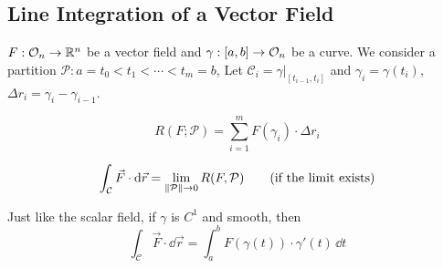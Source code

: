 \documentclass[../Analysis-3.tex]{subfiles}
\begin{document}
\subsection{Line Integration of a Vector Field}

$F:\mathcal{O}_{n} \to \mathbb{R}^n$ be a vector field and $\gamma:[a,b] \to \mathcal{O}_{n}$ be a curve. We consider a partition $\mathcal{P}: a =t_0<t_1<\cdots < t_m=b$, Let $\mathcal{C}_i = \gamma|_{[t_{i-1},t_i]}$ and $\gamma_i = \gamma(t_i)$, $\Delta r_i = \gamma_{i} - \gamma_{i-1}$.

\[R(F;\mathcal{P})= \sum_{i=1}^m F(\gamma_i)\cdot \Delta r_i\]

\begin{align*}
  \int_{\mathcal{C}} \vec{F}\cdot \dd\vec{r} = \lim_{\norm{\mathcal{P}}\to 0} R(F,\mathcal{P}) \tag{if the limit exists}
\end{align*}

Just like the scalar field, if $\gamma$ is $C^1$ and smooth, then
\begin{equation}
  \int_{\mathcal{C}} \vec{F}\cdot \dd\vec{r} = \int_a^b F(\gamma(t))\cdot \gamma'(t) \, \dd t \label{eq:23:3:lint}
\end{equation}
\end{document}
